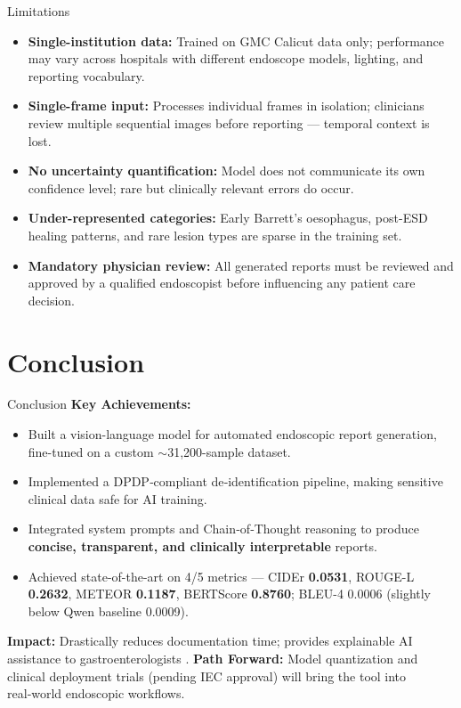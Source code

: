 ﻿\documentclass[aspectratio=169]{beamer}
\newcommand{\scite}[1]{{\footnotesize\color{darkgray}\citet{#1}}}
\begin{document}
\begin{frame}{Limitations}
\begin{itemize}
    \item \textbf{Single-institution data:} Trained on GMC Calicut data only; performance may vary across hospitals with different endoscope models, lighting, and reporting vocabulary.
    \item \textbf{Single-frame input:} Processes individual frames in isolation; clinicians review multiple sequential images before reporting --- temporal context is lost.
    \item \textbf{No uncertainty quantification:} Model does not communicate its own confidence level; rare but clinically relevant errors do occur.
    \item \textbf{Under-represented categories:} Early Barrett's oesophagus, post-ESD healing patterns, and rare lesion types are sparse in the training set.
    \item \textbf{Mandatory physician review:} All generated reports must be reviewed and approved by a qualified endoscopist before influencing any patient care decision.
\end{itemize}
\end{frame}

\section{Conclusion}
\begin{frame}{Conclusion}
\textbf{Key Achievements:}
\begin{itemize}
    \item Built a vision-language model for automated endoscopic report generation, fine-tuned on a custom $\sim$31,200-sample dataset.
    \item Implemented a DPDP‑compliant de‑identification pipeline, making sensitive clinical data safe for AI training.
    \item Integrated system prompts and Chain‑of‑Thought reasoning to produce \textbf{concise, transparent, and clinically interpretable} reports.
        \item Achieved state-of-the-art on 4/5 metrics --- CIDEr \textbf{0.0531}, ROUGE-L \textbf{0.2632}, METEOR \textbf{0.1187}, BERTScore \textbf{0.8760}; BLEU-4 0.0006 (slightly below Qwen baseline 0.0009).
\end{itemize}
\vspace{1em}
\textbf{Impact:} Drastically reduces documentation time; provides explainable AI assistance to gastroenterologists \scite{jama2024burden,bmj2024impact}.
\vspace{1em}
\textbf{Path Forward:} Model quantization \scite{dettmers2023qlora,frantar2023gptq} and clinical deployment trials (pending IEC approval) will bring the tool into real‑world endoscopic workflows.
\end{frame}
\end{document}
